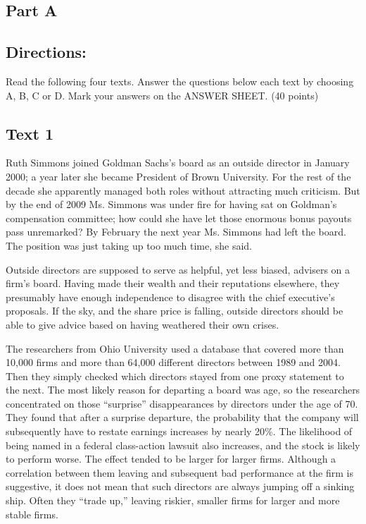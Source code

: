 \documentclass[UTF8,11pt]{ctexart}
\begin{document}
\subsection*{\textbf{Part A}}


\subsection*{\textbf{Directions:}}


Read the following four texts. Answer the questions below each text by choosing A, B, C or D. Mark your answers on the ANSWER SHEET. (40 points)


\subsection*{\textbf{Text 1}}


Ruth Simmons joined Goldman Sachs’s board as an outside director in January 2000; a year later she became President of Brown University. For the rest of the decade she apparently managed both roles without attracting much criticism. But by the end of 2009 Ms. Simmons was under fire for having sat on Goldman’s compensation committee; how could she have let those enormous bonus payouts pass unremarked? By February the next year Ms. Simmons had left the board. The position was just taking up too much time, she said.


Outside directors are supposed to serve as helpful, yet less biased, advisers on a firm’s board. Having made their wealth and their reputations elsewhere, they presumably have enough independence to disagree with the chief executive’s proposals. If the sky, and the share price is falling, outside directors should be able to give advice based on having weathered their own crises.


The researchers from Ohio University used a database that covered more than 10,000 firms and more than 64,000 different directors between 1989 and 2004. Then they simply checked which directors stayed from one proxy statement to the next. The most likely reason for departing a board was age, so the researchers concentrated on those “surprise” disappearances by directors under the age of 70. They found that after a surprise departure, the probability that the company will subsequently have to restate earnings increases by nearly 20\%. The likelihood of being named in a federal class-action lawsuit also increases, and the stock is likely to perform worse. The effect tended to be larger for larger firms. Although a correlation between them leaving and subsequent bad performance at the firm is suggestive, it does not mean that such directors are always jumping off a sinking ship. Often they “trade up,” leaving riskier, smaller firms for larger and more stable firms.
\end{document}
